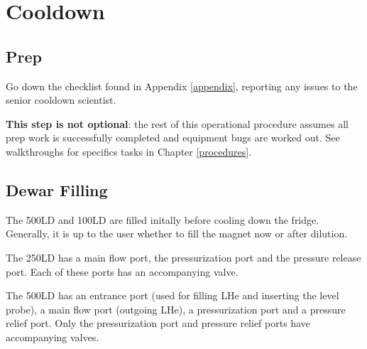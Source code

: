 \section{Cooldown}
\subsection{Prep}
\label{practical-op:prep}
Go down the checklist found in Appendix \ref{appendix}, reporting any issues to the senior cooldown scientist.

\textbf{This step is not optional}: the rest of this operational procedure assumes all prep work is successfully completed and equipment bugs are worked out.  See walkthroughs for specifics tasks in Chapter \ref{procedures}.

\subsection{Dewar Filling}
The 500LD and 100LD are filled initally before cooling down the fridge.  Generally, it is up to the user whether to fill the magnet now or after dilution.

The 250LD has a main flow port, the pressurization port and the pressure release port.  Each of these ports has an accompanying valve.

The 500LD has an entrance port (used for filling LHe and inserting the level probe), a main flow port (outgoing LHe), a pressurization port and a pressure relief port.  Only the pressurization port and pressure relief ports have accompanying valves.

